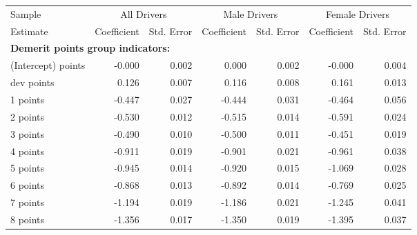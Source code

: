 
\begin{table}%
\centering 
\begin{tabular}{l r r r r r r} 

\hline 
 

Sample 
 & \multicolumn{2}{c}{All  Drivers}  & \multicolumn{2}{c}{Male  Drivers}  & \multicolumn{2}{c}{Female  Drivers}   \\ 
 

 \cmidrule(lr){1-1}\cmidrule(lr){2-3}\cmidrule(lr){4-5}\cmidrule(lr){6-7} 

Estimate  & Coefficient & Std. Error  & Coefficient & Std. Error  & Coefficient & Std. Error   \\ 
 

\hline 
 
\multicolumn{4}{l}{\textbf{Demerit points group indicators:}}  \\ 
 
(Intercept) points  & -0.000  &  0.002  &  0.000  &  0.002  & -0.000  &  0.004   \\ 
 
dev points  &  0.126  &  0.007  &  0.116  &  0.008  &  0.161  &  0.013   \\ 
 
1 points  & -0.447  &  0.027  & -0.444  &  0.031  & -0.464  &  0.056   \\ 
 
2 points  & -0.530  &  0.012  & -0.515  &  0.014  & -0.591  &  0.024   \\ 
 
3 points  & -0.490  &  0.010  & -0.500  &  0.011  & -0.451  &  0.019   \\ 
 
4 points  & -0.911  &  0.019  & -0.901  &  0.021  & -0.961  &  0.038   \\ 
 
5 points  & -0.945  &  0.014  & -0.920  &  0.015  & -1.069  &  0.028   \\ 
 
6 points  & -0.868  &  0.013  & -0.892  &  0.014  & -0.769  &  0.025   \\ 
 
7 points  & -1.194  &  0.019  & -1.186  &  0.021  & -1.245  &  0.041   \\ 
 
8 points  & -1.356  &  0.017  & -1.350  &  0.019  & -1.395  &  0.037   \\ 
 

\end{tabular}
\end{table}
